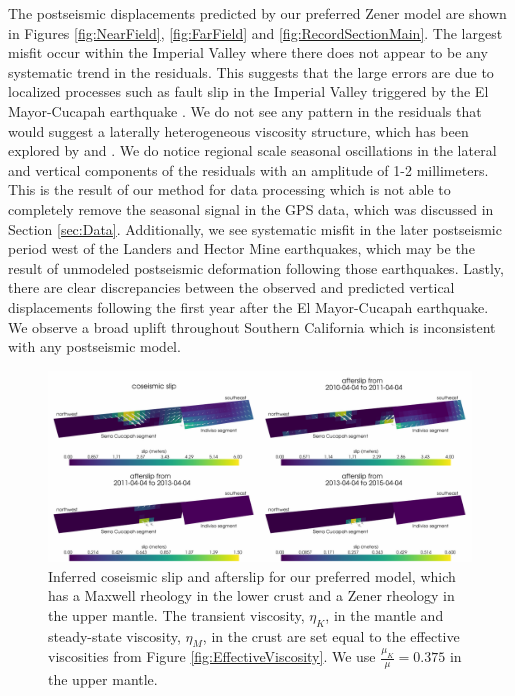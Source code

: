 \documentclass[draft,linenumbers]{AGUJournal}
\begin{document}
The postseismic displacements predicted by our preferred Zener model are shown in Figures \ref{fig:NearField}, \ref{fig:FarField} and \ref{fig:RecordSectionMain}.  The largest misfit occur within the Imperial Valley where there does not appear to be any systematic trend in the residuals.  This suggests that the large errors are due to localized processes such as fault slip in the Imperial Valley triggered by the El Mayor-Cucapah earthquake \citep{Wei2011a,Wei2015}.  We do not see any pattern in the residuals that would suggest a laterally heterogeneous viscosity structure, which has been explored by \citet{Pollitz2012} and \citet{Rollins2015}.  We do notice regional scale seasonal oscillations in the lateral and vertical components of the residuals with an amplitude of 1-2 millimeters.  This is the result of our method for data processing which is not able to completely remove the seasonal signal in the GPS data, which was discussed in Section \ref{sec:Data}.  Additionally, we see systematic misfit in the later postseismic period west of the Landers and Hector Mine earthquakes, which may be the result of unmodeled postseismic deformation following those earthquakes.  Lastly, there are clear discrepancies between the observed and predicted vertical displacements following the first year after the El Mayor-Cucapah earthquake. We observe a broad uplift throughout Southern California which is inconsistent with any postseismic model.

\begin{figure}
\includegraphics[scale=0.9]{Figures/2016jb013114-p14}
\centering 
\caption{Inferred coseismic slip and afterslip for our preferred model, which has a Maxwell rheology in the lower crust and a Zener rheology in the upper mantle.  The transient viscosity, $\eta_K$, in the mantle and steady-state viscosity, $\eta_M$, in the crust are set equal to the effective viscosities from Figure \ref{fig:EffectiveViscosity}. We use $\frac{\mu_K}{\mu}=0.375$ in the upper mantle.}
\label{fig:FinalSlip}
\end{figure}
  
\end{document}
